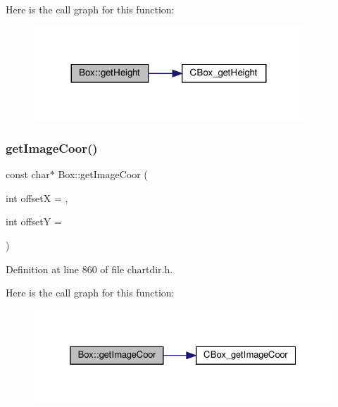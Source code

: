 Here is the call graph for this function\+:
\nopagebreak
\begin{figure}[H]
\begin{center}
\leavevmode
\includegraphics[width=287pt]{class_box_a3bfc762d093200d993d77fe89e0c6f18_cgraph}
\end{center}
\end{figure}
\mbox{\label{class_box_a75e23fd1fe27b6dd49bbca3477bda886}} 
\subsubsection{\texorpdfstring{get\+Image\+Coor()}{getImageCoor()}}
{\footnotesize\ttfamily const char$\ast$ Box\+::get\+Image\+Coor (\begin{DoxyParamCaption}\item[{int}]{offsetX = {},  }\item[{int}]{offsetY = {} }\end{DoxyParamCaption})\hspace{0.3cm}{\ttfamily [inline]}}



Definition at line 860 of file chartdir.\+h.

Here is the call graph for this function\+:
\nopagebreak
\begin{figure}[H]
\begin{center}
\leavevmode
\includegraphics[width=325pt]{class_box_a75e23fd1fe27b6dd49bbca3477bda886_cgraph}
\end{center}
\end{figure}
\mbox{\label{class_box_a8162cf06a56275fd6a20a5295eac68cd}} 
